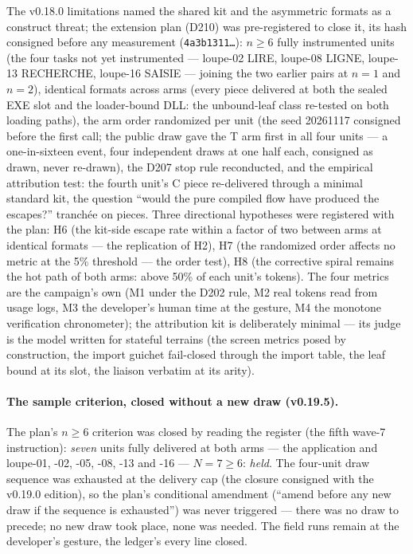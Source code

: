 \documentclass[11pt,a4paper]{article}
\newcommand{\code}[1]{\texttt{\small #1}}
\begin{document}
The v0.18.0 limitations named the shared kit and the asymmetric formats
as a construct threat; the extension plan (D210) was pre-registered to
close it, its hash consigned before any measurement
(\code{4a3b1311\ldots}): $n\ge6$ fully instrumented units (the four
tasks not yet instrumented --- loupe-02 LIRE, loupe-08 LIGNE, loupe-13
RECHERCHE, loupe-16 SAISIE --- joining the two earlier pairs at
$n{=}1$ and $n{=}2$), identical formats across arms (every piece
delivered at both the sealed EXE slot and the loader-bound DLL: the
unbound-leaf class re-tested on both loading paths), the arm order
randomized per unit (the seed 20261117 consigned before the first
call; the public draw gave the T arm first in all four units --- a
one-in-sixteen event, four independent draws at one half each,
consigned as drawn, never re-drawn), the D207 stop
rule reconducted, and the empirical attribution test: the fourth
unit's C piece re-delivered through a minimal standard kit, the
question ``would the pure compiled flow have produced the escapes?''
tranch\'ee on pieces. Three directional hypotheses were registered
with the plan: H6 (the kit-side escape rate within a factor of two
between arms at identical formats --- the replication of H2), H7 (the
randomized order affects no metric at the 5\% threshold --- the order
test), H8 (the corrective spiral remains the hot path of both arms:
above 50\% of each unit's tokens). The four metrics are the
campaign's own (M1 under the D202 rule, M2 real tokens read from
usage logs, M3 the developer's human time at the gesture, M4 the
monotone verification chronometer); the attribution kit is deliberately
minimal --- its judge is the model written for stateful terrains (the
screen metrics posed by construction, the import guichet fail-closed
through the import table, the leaf bound at its slot, the liaison
verbatim at its arity).

\paragraph{The sample criterion, closed without a new draw (v0.19.5).}
The plan's $n\ge6$ criterion was closed by reading the register (the
fifth wave-7 instruction): \emph{seven} units fully delivered at both
arms --- the application and loupe-01, -02, -05, -08, -13 and -16 ---
$N{=}7\ge6$: \emph{held}. The four-unit draw sequence was exhausted
at the delivery cap (the closure consigned with the v0.19.0 edition),
so the plan's conditional amendment (``amend before any new draw if
the sequence is exhausted'') was never triggered --- there was no draw
to precede; no new draw took place, none was needed. The field runs
remain at the developer's gesture, the ledger's every line closed.
\end{document}
